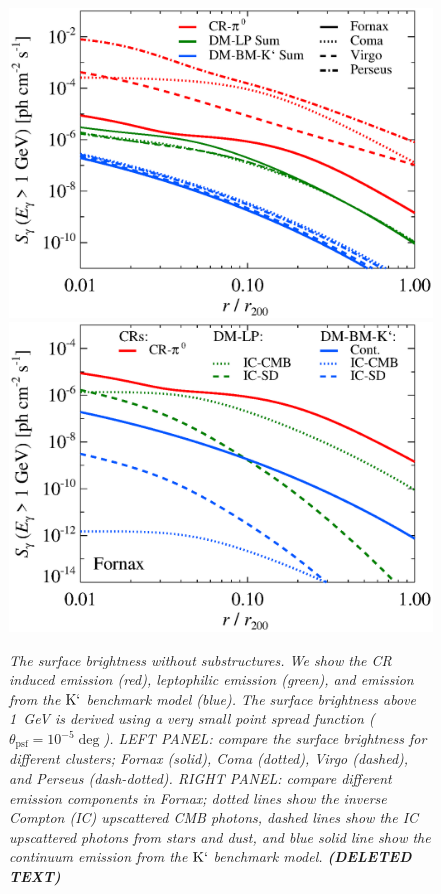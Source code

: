 \documentclass[10pt,aps,pra,reprint,amsmath,amsfonts,amssymb,showpacs]{revtex4-1}
\def\del#1{{\bf (DELETED TEXT)}}
\newcommand{\rmn}{\mathrm}
\newcommand{\Kp}{\rmn{K}`}
\begin{document}
\begin{figure}
\begin{minipage}{2.0\columnwidth}
  \includegraphics[width=0.49\columnwidth]{figures/SB.v9.1GeV.SF300.noSuB.elmu.eps}
  \includegraphics[width=0.49\columnwidth]{figures/SB.fornax.v9.1GeV.SF300.noSuB.elmu.eps}
\caption{\it The surface brightness without substructures. We show the
  CR induced emission (red), leptophilic emission (green), and
  emission from the $\Kp$ benchmark model (blue). The surface
  brightness above 1~GeV is derived using a very small point spread
  function ($\theta_\rmn{psf}=10^{-5}\deg$). LEFT PANEL: compare the
  surface brightness for different clusters; Fornax (solid), Coma
  (dotted), Virgo (dashed), and Perseus (dash-dotted).  RIGHT PANEL:
  compare different emission components in Fornax; dotted lines show
  the inverse Compton (IC) upscattered CMB photons, dashed lines show
  the IC upscattered photons from stars and dust, and blue solid line
  show the continuum emission from the $\Kp$ benchmark
  model. \del{Since cooling is dominated by IR and UV processes in the
    center, the spatial dependence of the equilibrium electron spectra
    cancels the spatial dependence on the upscattered IR photon,
    resulting in a smooth halo dependence (density square) in the
    center. The spatial profile for the upscattered CMB photons is
    flatter in the center since the strong spatial dependence inferred
    from cooling counteracts the smooth halo contribution. Cluster
    outskirts dominated by the emission from DM, although large
    uncertainty in the gas density profile.}}
 \label{fig12}
\end{minipage}
\end{figure}
\end{document}
